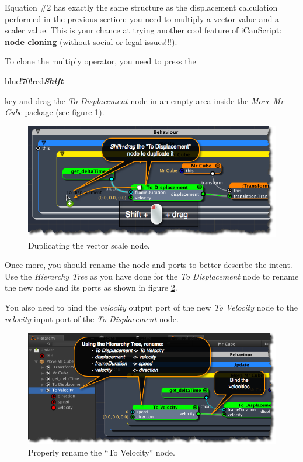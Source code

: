 Equation \#2 has exactly the same structure as the displacement calculation performed in the previous section: you need to multiply a vector value and a scaler value. This is your chance at trying another cool feature of iCanScript: \textbf{node cloning} (without social or legal issues!!!).

To clone the multiply operator, you need to press the \begin{color}{blue!70!red}\emph{\textbf{Shift}}\end{color} key and drag the \emph{To Displacement} node in an empty area inside the \emph{Move Mr Cube} package (see figure \ref{duplicate-vector-scale.png}).

\begin{figure}[htbp]
\centering
\includegraphics[keepaspectratio,width=\textwidth,height=0.75\textheight]{duplicate-vector-scale.png}
\caption{Duplicating the vector scale node.}
\label{duplicate-vector-scale.png}
\end{figure}

Once more, you should rename the node and ports to better describe the intent. Use the \emph{Hierarchy Tree} as you have done for the \emph{To Displacement} node to rename the new node and its ports as shown in figure \ref{rename-to-velocity-node.png}.

You also need to bind the \emph{velocity} output port of the new \emph{To Velocity} node to the \emph{velocity} input port of the \emph{To Displacement} node.

\begin{figure}[htbp]
\centering
\includegraphics[keepaspectratio,width=\textwidth,height=0.75\textheight]{rename-to-velocity-node.png}
\caption{Properly rename the ``To Velocity'' node.}
\label{rename-to-velocity-node.png}
\end{figure}

